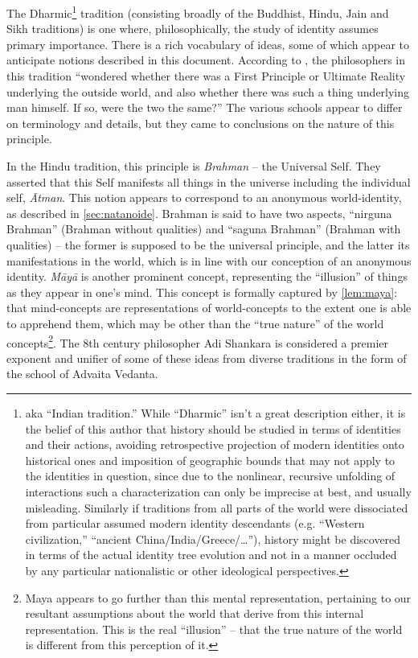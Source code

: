 \documentclass[pra,twocolumn,groupedaddress,10pt]{revtex4}
\theoremstyle{definition}
\begin{document}
The Dharmic\footnote{aka ``Indian tradition.'' While ``Dharmic'' isn't a great description either, it is the belief of this author that history should be studied in terms of identities and their actions, avoiding retrospective projection of modern identities onto historical ones and imposition of geographic bounds that may not apply to the identities in question, since due to the nonlinear, recursive unfolding of interactions such a characterization can only be imprecise at best, and usually misleading. Similarly if traditions from all parts of the world were dissociated from particular assumed modern identity descendants (e.g. ``Western civilization,'' ``ancient China/India/Greece/\ldots''), history might be discovered in terms of the actual identity tree evolution and not in a manner occluded by any particular nationalistic or other ideological perspectives.} tradition (consisting broadly of the Buddhist, Hindu, Jain and Sikh traditions) is one where, philosophically, the study of identity assumes primary importance. There is a rich vocabulary of ideas, some of which appear to anticipate notions described in this document. According to \cite{atmabodha}, the philosophers in this tradition ``wondered whether there was a First Principle or Ultimate Reality underlying the outside world, and also whether there was such a thing underlying man himself. If so, were the two the same?'' The various schools appear to differ on terminology and details, but they came to conclusions on the nature of this principle.

In the Hindu tradition, this principle is \textit{Brahman} -- the Universal Self. They asserted that this Self manifests all things in the universe including the individual self, \textit{\={A}tman}. This notion appears to correspond to an anonymous world-identity, as described in \autoref{sec:natanoide}. Brahman is said to have two aspects, ``nirguna Brahman'' (Brahman without qualities) and ``saguna Brahman'' (Brahman with qualities) -- the former is supposed to be the universal principle, and the latter its manifestations in the world, which is in line with our conception of an anonymous identity. \textit{M\={a}y\={a}} is another prominent concept, representing the ``illusion'' of things as they appear in one's mind. This concept is formally captured by \autoref{lem:maya}: that mind-concepts are representations of world-concepts to the extent one is able to apprehend them, which may be other than the ``true nature'' of the world concepts\footnote{Maya appears to go further than this mental representation, pertaining to our resultant assumptions about the world that derive from this internal representation. This is the real ``illusion'' -- that the true nature of the world is different from this perception of it.}. The 8th century philosopher Adi Shankara\cite{shankara} is considered a premier exponent and unifier of some of these ideas from diverse traditions in the form of the school of Advaita Vedanta. %
\end{document}
